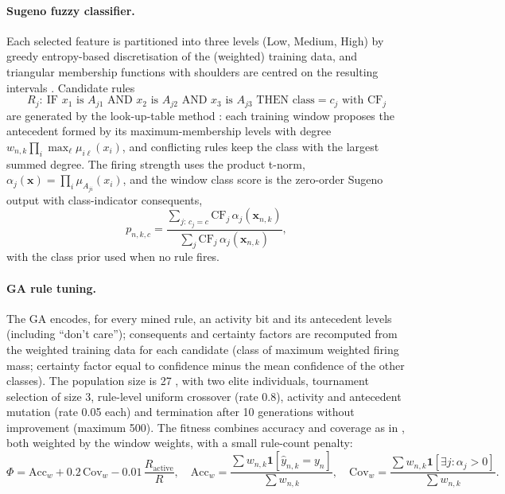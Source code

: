 \documentclass[11pt,a4paper]{article}
\begin{document}
\paragraph{Sugeno fuzzy classifier.} Each selected feature is partitioned into three levels (Low, Medium, High) by greedy entropy-based discretisation of the (weighted) training data, and triangular membership functions with shoulders are centred on the resulting intervals \cite{FarhadiSedehi2024a}. Candidate rules
\begin{equation}
R_j:\ \text{IF } x_1 \text{ is } A_{j1} \text{ AND } x_2 \text{ is } A_{j2} \text{ AND } x_3 \text{ is } A_{j3} \text{ THEN class} = c_j \text{ with } \mathrm{CF}_j
\end{equation}
are generated by the look-up-table method \cite{WangMendel1992}: each training window proposes the antecedent formed by its maximum-membership levels with degree $w_{n,k}\prod_i\max_\ell\mu_{i\ell}(x_i)$, and conflicting rules keep the class with the largest summed degree. The firing strength uses the product t-norm, $\alpha_j(\mathbf{x})=\prod_{i}\mu_{A_{ji}}(x_i)$, and the window class score is the zero-order Sugeno output with class-indicator consequents,
\begin{equation}
p_{n,k,c} = \frac{\sum_{j:\,c_j=c}\mathrm{CF}_j\,\alpha_j(\mathbf{x}_{n,k})}{\sum_{j}\mathrm{CF}_j\,\alpha_j(\mathbf{x}_{n,k})},
\label{eq:score}
\end{equation}
with the class prior used when no rule fires.

\paragraph{GA rule tuning.} The GA encodes, for every mined rule, an activity bit and its antecedent levels (including ``don't care''); consequents and certainty factors are recomputed from the weighted training data for each candidate (class of maximum weighted firing mass; certainty factor equal to confidence minus the mean confidence of the other classes). The population size is 27 \cite{FarhadiSedehi2024a}, with two elite individuals, tournament selection of size 3, rule-level uniform crossover (rate 0.8), activity and antecedent mutation (rate 0.05 each) and termination after 10 generations without improvement (maximum 500). The fitness combines accuracy and coverage as in \cite{FarhadiSedehi2024a}, both weighted by the window weights, with a small rule-count penalty:
\begin{equation}
\Phi = \mathrm{Acc}_w + 0.2\,\mathrm{Cov}_w - 0.01\,\frac{R_{\mathrm{active}}}{R},\quad
\mathrm{Acc}_w = \frac{\sum w_{n,k}\mathbf{1}[\hat y_{n,k}=y_n]}{\sum w_{n,k}},\quad
\mathrm{Cov}_w = \frac{\sum w_{n,k}\mathbf{1}[\exists j:\alpha_j>0]}{\sum w_{n,k}}.
\label{eq:fit}
\end{equation}
\end{document}
